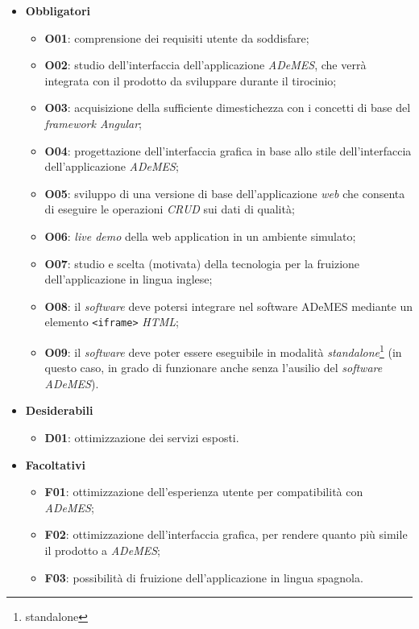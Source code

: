 \begin{itemize}
    \item \textbf{Obbligatori}
        \begin{itemize}
            \item \textbf{O01}: comprensione dei requisiti utente da soddisfare;
            \item \textbf{O02}: studio dell'interfaccia dell'applicazione \textit{ADeMES}, che verrà integrata con il prodotto da sviluppare durante il tirocinio; %
            \item \textbf{O03}: acquisizione della sufficiente dimestichezza con i concetti di base del \textit{framework Angular}; %
            \item \textbf{O04}: progettazione dell'interfaccia grafica in base allo stile dell'interfaccia dell'applicazione \textit{ADeMES}; %
            \item \textbf{O05}: sviluppo di una versione di base dell'applicazione \textit{web} che consenta di eseguire le operazioni \textit{CRUD} sui dati di qualità; %
            \item \textbf{O06}: \textit{live demo} della web application in un ambiente simulato; %
            \item \textbf{O07}: studio e scelta (motivata) della tecnologia per la fruizione dell'applicazione in lingua inglese; %
            \item \textbf{O08}: il \textit{software} deve potersi integrare nel software ADeMES mediante un elemento \texttt{<iframe>} \textit{HTML}; %
            \item \textbf{O09}: il \textit{software} deve poter essere eseguibile in modalità \textit{standalone}\footnote{\gls{standalone}} (in questo caso, in grado di funzionare anche senza l'ausilio del \textit{software ADeMES}). %
        \end{itemize}
    \item \textbf{Desiderabili}
        \begin{itemize}
            \item \textbf{D01}: ottimizzazione dei servizi esposti. %
        \end{itemize}
    \item \textbf{Facoltativi}
        \begin{itemize}
            \item \textbf{F01}: ottimizzazione dell'esperienza utente per compatibilità con \textit{ADeMES}; %
            \item \textbf{F02}: ottimizzazione dell'interfaccia grafica, per rendere quanto più simile il prodotto a \textit{ADeMES}; %
            \item \textbf{F03}: possibilità di fruizione dell'applicazione in lingua spagnola. %
        \end{itemize}
\end{itemize}



